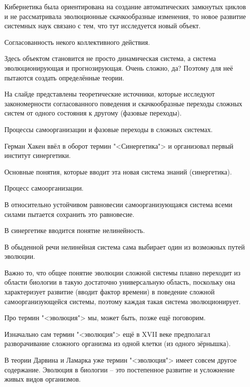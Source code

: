 \documentclass[main.tex]{subfiles}
\begin{document}
Кибернетика была ориентирована на создание автоматических замкнутых циклов и не рассматривала эволюционные скачкообразные изменения, то новое развитие системных наук связано с тем, что тут исследуется новый объект.

Согласованность некого коллективного действия.

Здесь объектом становится не просто динамическая система, а система эволюционирующая и прогнозирующая.
Очень сложно, да?
Поэтому для неё пытаются создать определённые теории.

На слайде представлены теоретические источники, которые исследуют закономерности согласованного поведения и скачкообразные переходы сложных систем от одного состояния к другому (фазовые переходы).

Процессы самоорганизации и фазовые переходы в сложных системах.

Герман Хакен ввёл в оборот термин "<Синергетика"> и организовал первый институт синергетики.



Основные понятия, которые вводит эта новая система знаний (синергетика).

Процесс самоорганизации.

В относительно устойчивом равновесии самоорганизующаяся система всеми силами пытается сохранить это равновесие.



В синергетике вводится понятие нелинейность.

В обыденной речи нелинейная система сама выбирает один из возможных путей эволюции.

Важно то, что общее понятие эволюции сложной системы плавно переходит из области биологии в такую достаточно универсальную область, поскольку она характеризует развитие (вводит фактор времени) в поведение сложной самоорганизующейся системы, поэтому каждая такая система эволюционирует.

Про термин "<эволюция"> мы, может быть, позже ещё поговорим.

Изначально сам термин "<эволюция"> ещё в XVII веке предполагал разворачивание сложного организма из одной клетки (из одного зёрнышка).

В теории Дарвина и Ламарка уже термин "<эволюция"> имеет совсем другое содержание.
Эволюция в биологии -- это постепенное развитие и усложнение живых видов организмов.
\end{document}
